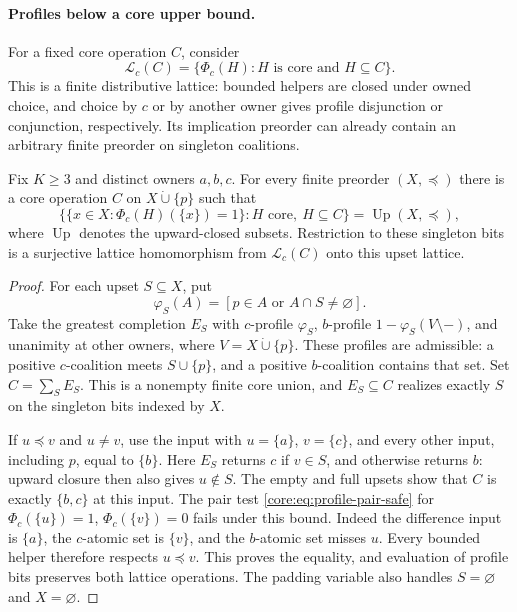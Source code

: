 \paragraph{Profiles below a core upper bound.}
For a fixed core operation $C$, consider
\[
 \mathcal L_c(C)=\{\Phi_c(H):H\text{ is core and }H\subseteq C\}.
\]
This is a finite distributive lattice: bounded helpers are closed under
owned choice, and choice by $c$ or by another owner gives profile
disjunction or conjunction, respectively. Its implication preorder can
already contain an arbitrary finite preorder on singleton coalitions.

\begin{proposition}
\label{core:prop:principal-profile-preorders}
Fix $K\geq3$ and distinct owners $a,b,c$. For every finite preorder
$(X,\preceq)$ there is a core operation $C$ on $X\mathbin{\dot\cup}\{p\}$ such that
\[
 \bigl\{\{x\in X:\Phi_c(H)(\{x\})=1\}:H\text{ core},\ H\subseteq C\bigr\}
 =\operatorname{Up}(X,\preceq),
\]
where $\operatorname{Up}$ denotes the upward-closed subsets. Restriction
to these singleton bits is a surjective lattice homomorphism from
$\mathcal L_c(C)$ onto this upset lattice.
\end{proposition}
\begin{proof}
For each upset $S\subseteq X$, put
\[
 \varphi_S(A)=[p\in A\text{ or }A\cap S\ne\varnothing].
\]
Take the greatest completion $E_S$ with $c$-profile $\varphi_S$,
$b$-profile $1-\varphi_S(V\setminus -)$, and unanimity at other
owners, where $V=X\mathbin{\dot\cup}\{p\}$. These profiles are admissible:
a positive $c$-coalition meets $S\cup\{p\}$, and a positive
$b$-coalition contains that set. Set $C=\sum_SE_S$.
This is a nonempty finite core union, and $E_S\subseteq C$ realizes
exactly $S$ on the singleton bits indexed by $X$.

If $u\preceq v$ and $u\ne v$, use the input with $u=\{a\}$,
$v=\{c\}$, and every other input, including $p$, equal to $\{b\}$.
Here $E_S$ returns $c$ if $v\in S$, and otherwise returns $b$:
upward closure then also gives $u\notin S$. The empty and full upsets
show that $C$ is exactly $\{b,c\}$ at this input.
The pair test \eqref{core:eq:profile-pair-safe} for
$\Phi_c(\{u\})=1$, $\Phi_c(\{v\})=0$ fails under this bound.
Indeed the difference input is $\{a\}$, the $c$-atomic set is
$\{v\}$, and the $b$-atomic set misses $u$.
Every bounded helper therefore respects $u\preceq v$. This proves the
equality, and evaluation of profile bits preserves both lattice operations.
The padding variable also handles $S=\varnothing$ and $X=\varnothing$.
\end{proof}

